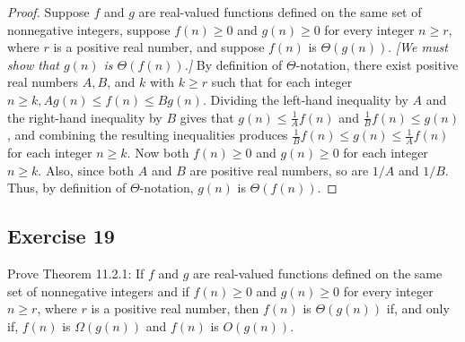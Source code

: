\documentclass[14pt]{extarticle}
\begin{document}
\begin{proof}
    Suppose \(f\) and \(g\) are real-valued functions defined on the same set of nonnegative integers, suppose \(f(n) \geq 0\)
    and \(g(n) \geq 0\) for every integer \(n \geq r\), where \(r\) is a positive real number, and suppose \(f(n)\) is
    \(\Theta(g(n))\). {\it [We must show that \(g(n)\) is \(\Theta(f(n))\).]} By definition of \(\Theta\)-notation, there
    exist positive real numbers \(A, B\), and \(k\) with \(k \geq r\) such that for each integer \(n \geq k, Ag(n) \leq f(n)
    \leq Bg(n)\). Dividing the left-hand inequality by \(A\) and the right-hand inequality by \(B\) gives that \(g(n) \leq
    \frac{1}{A}f(n)\) and \(\frac{1}{B}f(n) \leq g(n)\), and combining the resulting inequalities produces \(\frac{1}{B}
    f(n) \leq g(n) \leq \frac{1}{A}f(n)\) for each integer \(n \geq k\). Now both \(f(n) \geq 0\) and \(g(n) \geq 0\) for
    each integer \(n \geq k\). Also, since both \(A\) and \(B\) are positive real numbers, so are \(1/A\) and \(1/B\). Thus,
    by definition of \(\Theta\)-notation, \(g(n)\) is \(\Theta (f(n))\).
\end{proof}

\subsection{Exercise 19}
Prove Theorem 11.2.1: If \(f\) and \(g\) are real-valued functions defined on the same set of nonnegative integers and
if \(f(n) \geq 0\) and \(g(n) \geq 0\) for every integer \(n \geq r\), where \(r\) is a positive real number, then \(f(n)\)
is \(\Theta(g(n))\) if, and only if, \(f(n)\) is \(\Omega(g(n))\) and \(f(n)\) is \(O(g(n))\).
\end{document}
